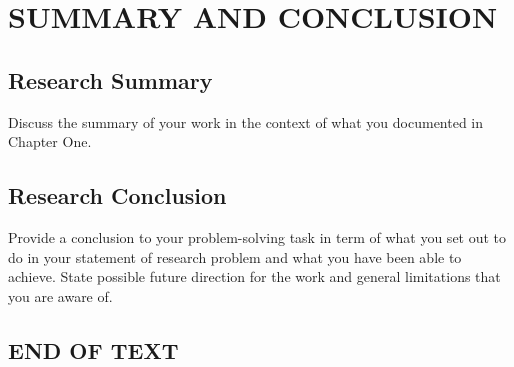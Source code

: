 \chapter{\large SUMMARY AND CONCLUSION}
\thispagestyle{empty}

\section{Research Summary}

Discuss the summary of your work in the context of what you documented in Chapter One.

\section{Research Conclusion}

Provide a conclusion to your problem-solving task in term of what you set out to do in your statement of research problem and what you have been able to achieve. State possible future direction for the work and general limitations that you are aware of. 

\section*{END OF TEXT}